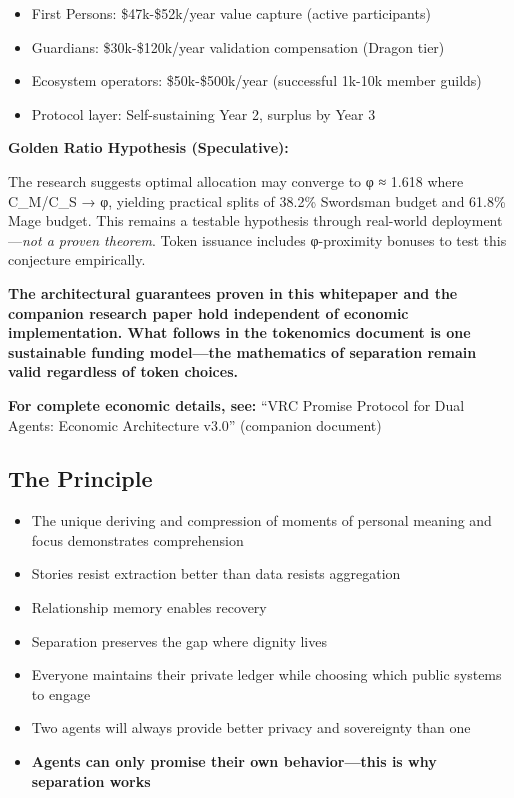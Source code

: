 \documentclass[
]{article}
\begin{document}
\begin{itemize}
\item
  First Persons: \$47k-\$52k/year value capture (active participants)
\item
  Guardians: \$30k-\$120k/year validation compensation (Dragon tier)
\item
  Ecosystem operators: \$50k-\$500k/year (successful 1k-10k member
  guilds)
\item
  Protocol layer: Self-sustaining Year 2, surplus by Year 3
\end{itemize}

\textbf{Golden Ratio Hypothesis (Speculative):}

The research suggests optimal allocation may converge to φ ≈ 1.618 where
C\_M/C\_S → φ, yielding practical splits of 38.2\% Swordsman budget and
61.8\% Mage budget. This remains a testable hypothesis through
real-world deployment---\emph{not a proven theorem}. Token issuance
includes φ-proximity bonuses to test this conjecture empirically.

\textbf{The architectural guarantees proven in this whitepaper and the
companion research paper hold independent of economic implementation.
What follows in the tokenomics document is one sustainable funding
model---the mathematics of separation remain valid regardless of token
choices.}

\textbf{For complete economic details, see:} ``VRC Promise Protocol for
Dual Agents: Economic Architecture v3.0'' (companion document)

\subsection{The Principle}\label{the-principle}

\begin{itemize}
\item
  The unique deriving and compression of moments of personal meaning and
  focus demonstrates comprehension
\item
  Stories resist extraction better than data resists aggregation
\item
  Relationship memory enables recovery
\item
  Separation preserves the gap where dignity lives
\item
  Everyone maintains their private ledger while choosing which public
  systems to engage
\item
  Two agents will always provide better privacy and sovereignty than one
\item
  \textbf{Agents can only promise their own behavior---this is why
  separation works}
\end{itemize}
\end{document}
